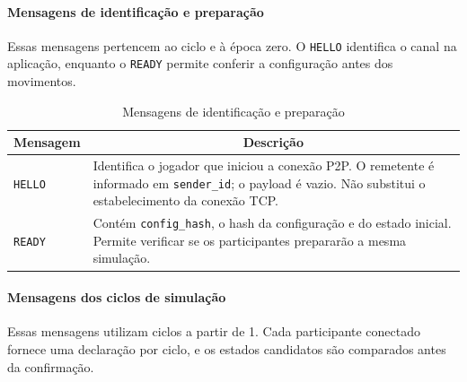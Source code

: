 \documentclass[11pt,a4paper]{article}
\begin{document}
\paragraph{Mensagens de identificação e preparação}

Essas mensagens pertencem ao ciclo e à época zero. O \texttt{HELLO} identifica o canal na aplicação, enquanto o \texttt{READY} permite conferir a configuração antes dos movimentos.

\begin{table}[H]
    \centering
    \caption{Mensagens de identificação e preparação}
    \label{tab:preparacao_p2p}
    \begin{tabular}{|p{3.5cm}|p{10cm}|}
        \hline
        \textbf{Mensagem} &
        \multicolumn{1}{c|}{\textbf{Descrição}} \\ \hline

        \texttt{HELLO} &
        Identifica o jogador que iniciou a conexão P2P. O remetente é informado em \texttt{sender\_id}; o payload é vazio. Não substitui o estabelecimento da conexão TCP. \\ \hline

        \texttt{READY} &
        Contém \texttt{config\_hash}, o hash da configuração e do estado inicial. Permite verificar se os participantes prepararão a mesma simulação. \\ \hline
    \end{tabular}
\end{table}

\paragraph{Mensagens dos ciclos de simulação}

Essas mensagens utilizam ciclos a partir de 1. Cada participante conectado fornece uma declaração por ciclo, e os estados candidatos são comparados antes da confirmação.
\end{document}

